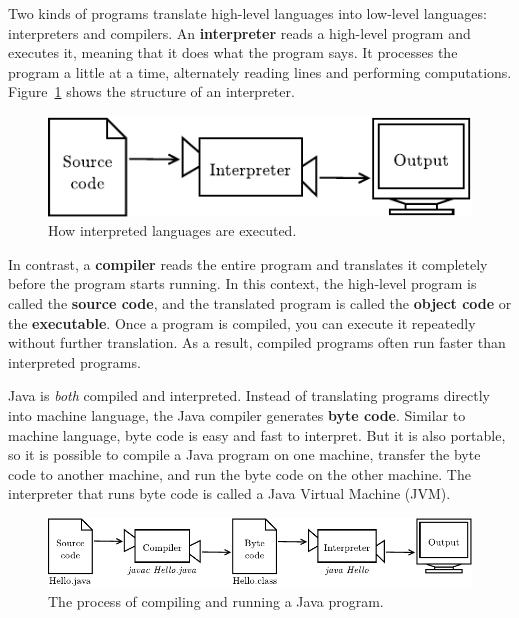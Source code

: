 \documentclass[12pt]{book}
\theoremstyle{exercise}
\begin{document}

Two kinds of programs translate high-level languages into low-level languages: interpreters and compilers.
An {\bf interpreter} reads a high-level program and executes it, meaning that it does what the program says.
It processes the program a little at a time, alternately reading lines and performing computations.
Figure~\ref{fig.interp} shows the structure of an interpreter.

\begin{figure}[!ht]
\begin{center}
\includegraphics{figs/interpreter.pdf}
\caption{How interpreted languages are executed.}
\label{fig.interp}
\end{center}
\end{figure}


In contrast, a {\bf compiler} reads the entire program and translates it completely before the program starts running.
In this context, the high-level program is called the {\bf source code}, and the translated program is called the {\bf object code} or the {\bf executable}.
Once a program is compiled, you can execute it repeatedly without further translation.
As a result, compiled programs often run faster than interpreted programs.


Java is {\em both} compiled and interpreted.
Instead of translating programs directly into machine language, the Java compiler generates {\bf byte code}.
Similar to machine language, byte code is easy and fast to interpret.
But it is also portable, so it is possible to compile a Java program on one machine, transfer the byte code to another machine, and run the byte code on the other machine.
The interpreter that runs byte code is called a Java Virtual Machine (JVM).

\begin{figure}[!ht]
\begin{center}
\includegraphics{figs/compiler.pdf}
\caption{The process of compiling and running a Java program.}
\label{fig.compile}
\end{center}
\end{figure}
\end{document}
